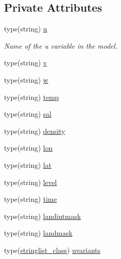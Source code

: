 \subsection*{Private Attributes}
\begin{DoxyCompactItemize}
\item 
type(string) \mbox{\hyperlink{structsimulationglobals__mod_1_1var__names__t_a05e03dc8cb0d9e041cd0989d4bb283f6}{u}}
\begin{DoxyCompactList}\small\item\em Name of the \textquotesingle{}u\textquotesingle{} variable in the model. \end{DoxyCompactList}\item 
type(string) \mbox{\hyperlink{structsimulationglobals__mod_1_1var__names__t_a037c76a1788e918a911686b1a357b63c}{v}}
\item 
type(string) \mbox{\hyperlink{structsimulationglobals__mod_1_1var__names__t_ae4070fb0bad811c92b85bb008b3a269d}{w}}
\item 
type(string) \mbox{\hyperlink{structsimulationglobals__mod_1_1var__names__t_a2b8a91d6d50fa1312daa7b33447a1f23}{temp}}
\item 
type(string) \mbox{\hyperlink{structsimulationglobals__mod_1_1var__names__t_aa74b646a2e2aecbd80fc9e14db09c1fc}{sal}}
\item 
type(string) \mbox{\hyperlink{structsimulationglobals__mod_1_1var__names__t_a8ece0e46cb7873a7b7f2a5ded27a93c8}{density}}
\item 
type(string) \mbox{\hyperlink{structsimulationglobals__mod_1_1var__names__t_ae81e1287e36878fcfed6360b14b05219}{lon}}
\item 
type(string) \mbox{\hyperlink{structsimulationglobals__mod_1_1var__names__t_aab90536922d15a1684cb7d0cfce99e95}{lat}}
\item 
type(string) \mbox{\hyperlink{structsimulationglobals__mod_1_1var__names__t_a1dc8ae36a22bfd43a9f1fd7e2d13548a}{level}}
\item 
type(string) \mbox{\hyperlink{structsimulationglobals__mod_1_1var__names__t_a3826ddc89095f68c7ff6ee007adaaa45}{time}}
\item 
type(string) \mbox{\hyperlink{structsimulationglobals__mod_1_1var__names__t_a200a4d2d418449d20df4d5d61eaef041}{landintmask}}
\item 
type(string) \mbox{\hyperlink{structsimulationglobals__mod_1_1var__names__t_a7f6f2e084fda25ccc0fe911e3a46fafe}{landmask}}
\item 
type(\mbox{\hyperlink{structsimulationglobals__mod_1_1stringlist__class}{stringlist\+\_\+class}}) \mbox{\hyperlink{structsimulationglobals__mod_1_1var__names__t_a4a7350ba83ed451757bc06279a3ba337}{uvariants}}

\end{DoxyCompactItemize}
